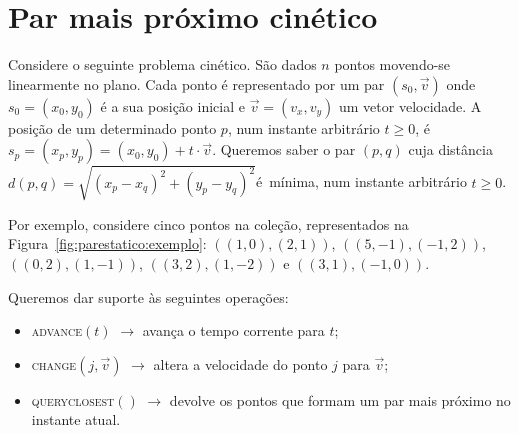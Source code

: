 

\chapter{Par mais próximo cinético}\label{ch:par-mais-proximo-cinetico}

Considere o seguinte problema cinético.
São dados $n$ pontos movendo-se linearmente no plano.
Cada ponto é representado por um par $(s_0, \vec{v})$ onde $s_0 = (x_0, y_0)$ é a sua posição
inicial e $\vec{v} = (v_x, v_y)$ um vetor velocidade.
A posição de um determinado ponto $p$, num instante arbitrário $t \geq 0$, é $s_p = (x_p, y_p) = (x_0,
y_0)+t\cdot \vec{v}$.
Queremos saber o par $(p,q)$ cuja distância $d(p, q) = \sqrt{(x_p - x_q)^2 +
    (y_p - y_q)^2}$é~mínima, num instante arbitrário $t \geq 0$.

Por exemplo, considere cinco pontos na coleção, representados na
Figura~\ref{fig:parestatico:exemplo}: $((1, 0), (2, 1))$, $((5, -1),
(-1, 2))$, $((0, 2), (1, -1))$, $((3, 2), (1, -2))$ e $((3, 1), (-1,
0))$.



Queremos dar suporte às seguintes operações:
\begin{itemize}
    \item \textsc{advance}$(t)$ $\rightarrow$ avança o tempo corrente
    para $t$;
    \item \textsc{change}$(j, \vec{v})$ $\rightarrow$ altera a
    velocidade do ponto $j$ para $\vec{v}$;
    \item \textsc{query\textunderscore closest}$()$ $\rightarrow$
    devolve os pontos que formam um par mais próximo no instante
    atual.
\end{itemize}



